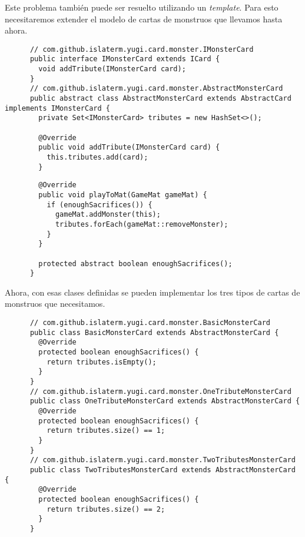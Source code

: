   \begin{Answer}[ref={ex:template-2}]
    Este problema también puede ser resuelto utilizando un \textit{template}.
    Para esto necesitaremos extender el modelo de cartas de monstruos que llevamos hasta 
    ahora.
    \begin{verbatim}
      // com.github.islaterm.yugi.card.monster.IMonsterCard
      public interface IMonsterCard extends ICard {
        void addTribute(IMonsterCard card);
      }
      // com.github.islaterm.yugi.card.monster.AbstractMonsterCard
      public abstract class AbstractMonsterCard extends AbstractCard implements IMonsterCard {
        private Set<IMonsterCard> tributes = new HashSet<>();

        @Override
        public void addTribute(IMonsterCard card) {
          this.tributes.add(card);
        }

    \end{verbatim}

    \begin{verbatim}
        @Override
        public void playToMat(GameMat gameMat) {
          if (enoughSacrifices()) {
            gameMat.addMonster(this);
            tributes.forEach(gameMat::removeMonster);
          }
        }

        protected abstract boolean enoughSacrifices();
      }
    \end{verbatim}

    Ahora, con esas clases definidas se pueden implementar los tres tipos de cartas de 
    monstruos que necesitamos.
    \begin{verbatim}
      // com.github.islaterm.yugi.card.monster.BasicMonsterCard
      public class BasicMonsterCard extends AbstractMonsterCard {
        @Override
        protected boolean enoughSacrifices() {
          return tributes.isEmpty();
        }
      }
      // com.github.islaterm.yugi.card.monster.OneTributeMonsterCard
      public class OneTributeMonsterCard extends AbstractMonsterCard {
        @Override
        protected boolean enoughSacrifices() {
          return tributes.size() == 1;
        }
      }
      // com.github.islaterm.yugi.card.monster.TwoTributesMonsterCard
      public class TwoTributesMonsterCard extends AbstractMonsterCard {
        @Override
        protected boolean enoughSacrifices() {
          return tributes.size() == 2;
        }
      }
    \end{verbatim}
  \end{Answer}
% 